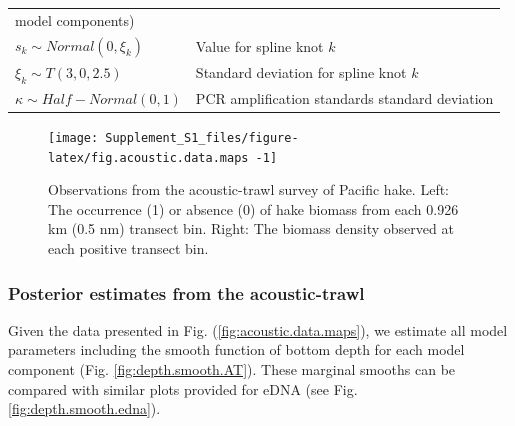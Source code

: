 \documentclass[
]{article}
\begin{document}
\begin{longtable}[]{@{}ll@{}}
\begin{minipage}[t]{0.47\columnwidth}
model components)\strut
\end{minipage}\tabularnewline
\begin{minipage}[t]{0.47\columnwidth}\raggedright
\(s_k \sim Normal(0,\xi_k)\)\strut
\end{minipage} & \begin{minipage}[t]{0.47\columnwidth}\raggedright
Value for spline knot \(k\)\strut
\end{minipage}\tabularnewline
\begin{minipage}[t]{0.47\columnwidth}\raggedright
\(\xi_k \sim T(3,0,2.5)\)\strut
\end{minipage} & \begin{minipage}[t]{0.47\columnwidth}\raggedright
Standard deviation for spline knot \(k\)\strut
\end{minipage}\tabularnewline
\begin{minipage}[t]{0.47\columnwidth}\raggedright
\(\kappa \sim Half-Normal(0,1)\)\strut
\end{minipage} & \begin{minipage}[t]{0.47\columnwidth}\raggedright
PCR amplification standards standard deviation\strut
\end{minipage}\tabularnewline
\bottomrule
\end{longtable}

\begin{figure}
\texttt{[image: Supplement\_S1\_files/figure-latex/fig.acoustic.data.maps -1]} \caption{\label{fig:acoustic.data.maps} Observations from the acoustic-trawl survey of Pacific hake. Left: The occurrence (1) or absence (0) of hake biomass from each 0.926 km (0.5 nm) transect bin. Right: The biomass density observed at each positive transect bin.}\label{fig:fig.acoustic.data.maps }
\end{figure}

\hypertarget{posterior-estimates-from-the-acoustic-trawl}{%
\subsubsection{Posterior estimates from the
acoustic-trawl}\label{posterior-estimates-from-the-acoustic-trawl}}

Given the data presented in Fig. (\ref{fig:acoustic.data.maps}), we
estimate all model parameters including the smooth function of bottom
depth for each model component (Fig. \ref{fig:depth.smooth.AT}). These
marginal smooths can be compared with similar plots provided for eDNA
(see Fig. \ref{fig:depth.smooth.edna}).
\end{document}

